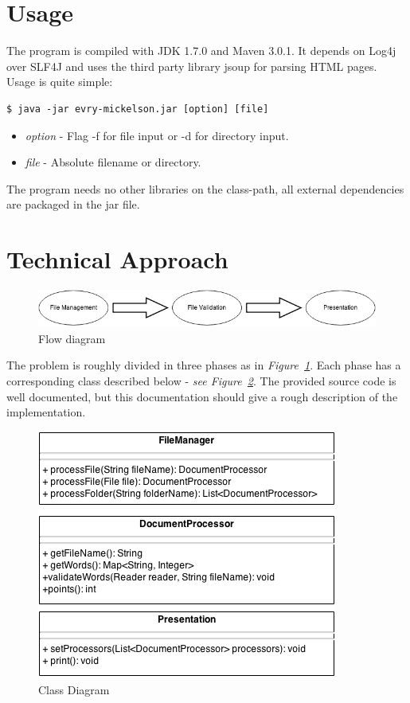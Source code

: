 \documentclass[a4paper]{article}
\begin{document}
\section{Usage}
The program is compiled with JDK 1.7.0 and Maven 3.0.1. It depends on Log4j over SLF4J and uses the third party library jsoup for parsing HTML pages\cite{jsoup}. Usage is quite simple:

\begin{verbatim} 
$ java -jar evry-mickelson.jar [option] [file]
\end{verbatim} 

\begin{itemize}
	\item \textit{option} - Flag -f for file input or -d for directory input.
	\item \textit{file} - Absolute filename or directory.
\end{itemize}

The program needs no other libraries on the class-path, all external dependencies are packaged in the jar file.

\section{Technical Approach}

\begin{figure}
	\includegraphics[scale=0.5]{evry-mickelson.png}
	\caption{Flow diagram}
	\label{fd}
\end{figure}

The problem is roughly divided in three phases as in \textit{Figure~\ref{fd}}. Each phase has a corresponding class described below - \textit{see Figure~\ref{cd}}. The provided source code is well documented, but this documentation should give a rough description of the implementation.

\begin{figure}
	\begin{center}
	\includegraphics[scale=0.5]{cd.png}
	\caption{Class Diagram}
	\label{cd}
	\end{center}
\end{figure}
\end{document}
